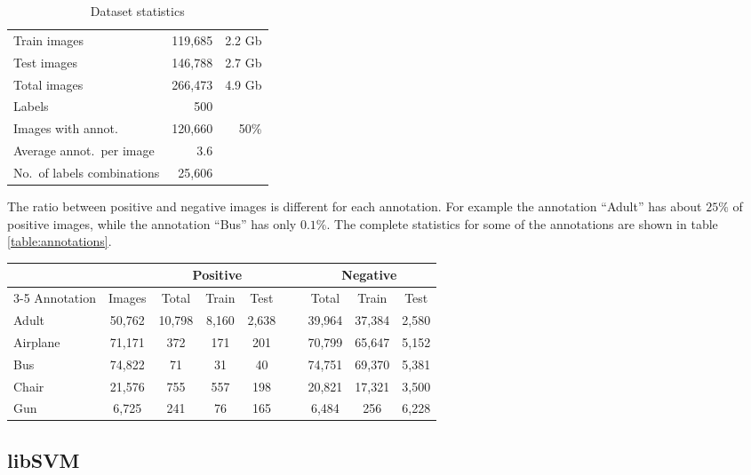 \begin{table}[htbp]
\caption{Dataset statistics}
\centering
\begin{tabular}{lrr}
    Train images      & 119,685 & 2.2 Gb \\
    Test images       & 146,788 & 2.7 Gb \\
    Total images      & 266,473 & 4.9 Gb \\
    Labels            & 500 \\
    Images with annot. & 120,660 & 50\% \\
    Average annot.~per image   & 3.6 \\
    No.~of labels combinations & 25,606 \\
\end{tabular}
\label{table:dataset}
\end{table}

The ratio between positive and negative images is different for each
annotation. For example the annotation ``Adult'' has about $25\%$ of positive
images, while the annotation ``Bus'' has only $0.1\%$. The complete statistics
for some of the annotations are shown in table \ref{table:annotations}.

\begin{table*}[htbp]
\caption{Annotation examples}
\centering
\begin{tabular}{lcccccccc}
    \phantom{abc} &  \phantom{abc} & \multicolumn{3}{c}{Positive} &
    ~ & \multicolumn{3}{c}{Negative}\\
    \cmidrule{3-5} \cmidrule{7-9}
    Annotation       & Images & Total & Train & Test && Total & Train & Test \\
    \midrule
    Adult        & 50,762 & 10,798 & 8,160 & 2,638 && 39,964 & 37,384 & 2,580 \\
    Airplane     & 71,171 & 372 & 171 & 201        && 70,799 & 65,647 & 5,152 \\
    Bus          & 74,822 & 71 & 31 & 40           && 74,751 & 69,370 & 5,381 \\
    Chair        & 21,576 & 755 & 557 & 198        && 20,821 & 17,321 & 3,500 \\
    Gun          &  6,725 & 241 & 76 & 165         && 6,484  &    256 & 6,228 \\
\end{tabular}
\label{table:annotations}
\end{table*}

\subsection{libSVM}

